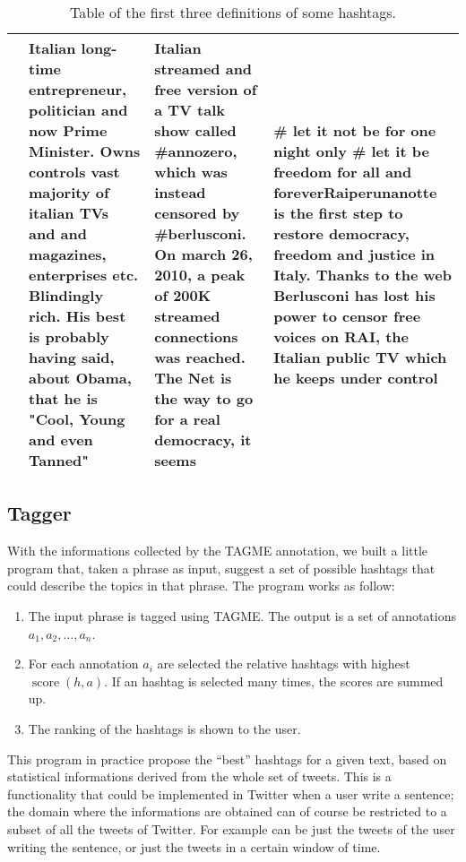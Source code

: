 \documentclass[a4paper,11pt,oneside]{article}
\DeclareMathOperator{\score}{score}
\begin{document}
\begin{table}[h]
\begin{tabular}{ | l | p{4cm} | p{4cm} | p{4cm} |}
\raisebox{-1mm}{raiperunanotte} & \small{Italian long-time entrepreneur, politician and now Prime Minister. Owns controls vast majority of italian TVs and and magazines, enterprises etc. Blindingly rich. His best is probably having said, about Obama, that he is "Cool, Young and even Tanned"} & \small{Italian streamed and free version of a TV talk show called \#annozero, which was instead censored by \#berlusconi. On march 26, 2010, a peak of 200K streamed connections was reached. The Net is the way to go for a real democracy, it seems} & \small{\# let it not be for one night only  \# let it be freedom for all and forever}\small{Raiperunanotte is the first step to restore democracy, freedom and justice in Italy. Thanks to the web Berlusconi has lost his power to censor free voices on RAI, the Italian public TV which he keeps under control}\\
 \hline
    \end{tabular}
    \caption{Table of the first three definitions of some hashtags.}
    \label{tab:pertinence}
\end{table}


\subsection{Tagger}
\label{sec:tagger}
With the informations collected by the TAGME annotation, we built a little program that, taken a phrase as input, suggest a set of possible hashtags that could describe the topics in that phrase.
The program works as follow:
\begin{enumerate}
\item The input phrase is tagged using TAGME. The output is a set of annotations $a_1, a_2,\ldots, a_n$.
\item For each annotation $a_i$ are selected the relative hashtags with highest $\score(h,a)$. If an hashtag is selected many times, the scores are summed up.
\item The ranking of the hashtags is shown to the user.
\end{enumerate}

This program in practice propose the ``best'' hashtags for a given text, based on statistical informations derived from the whole set of tweets. This is a functionality that could be implemented in Twitter when a user write a sentence; the domain where the informations are obtained can of course be restricted to a subset of all the tweets of Twitter. For example  can be just the tweets of the user writing the sentence, or just the tweets in a certain window of time.  
\end{document}
